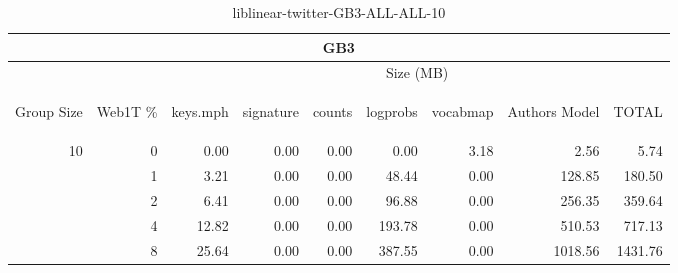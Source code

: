\begin{center}
\begin{table}[htbp]
\begin{tabular}{ | r | r | r | r | r | r | r | r | r |}
\hline
\multicolumn{9}{|c|}{GB3}\\
\hline
 & & \multicolumn{7}{|c|}{Size (MB)}\\ \cline{3-9}
\begin{sideways}Group Size\end{sideways} & \begin{sideways}Web1T \% \end{sideways} & \begin{sideways}keys.mph\end{sideways} & \begin{sideways}signature\end{sideways} & \begin{sideways}counts\end{sideways} & \begin{sideways}logprobs\end{sideways} & \begin{sideways}vocabmap\end{sideways} & \begin{sideways}Authors Model \end{sideways} & \begin{sideways}TOTAL\end{sideways}\\
\hline
\multirow{4}{*}{10}
 & 0 & 0.00 & 0.00 & 0.00 & 0.00 & 3.18 & 2.56 & 5.74\\ \cline{2-9}
 & 1 & 3.21 & 0.00 & 0.00 & 48.44 & 0.00 & 128.85 & 180.50\\ \cline{2-9}
 & 2 & 6.41 & 0.00 & 0.00 & 96.88 & 0.00 & 256.35 & 359.64\\ \cline{2-9}
 & 4 & 12.82 & 0.00 & 0.00 & 193.78 & 0.00 & 510.53 & 717.13\\ \cline{2-9}
 & 8 & 25.64 & 0.00 & 0.00 & 387.55 & 0.00 & 1018.56 & 1431.76\\ \cline{2-9}
\hline
\end{tabular}
\caption{liblinear-twitter-GB3-ALL-ALL-10}
\label{table:liblinear-twitter-GB3-ALL-ALL-10}
\end{table}
\end{center}

